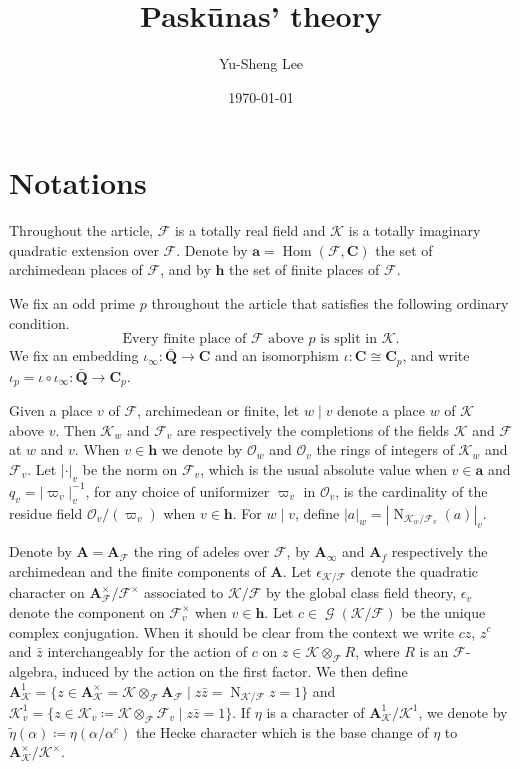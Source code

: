 \documentclass[leqno]{amsart}
\theoremstyle{definition}
\theoremstyle{remark}
\newcommand{\oo}{\mathcal{O}}
\newcommand{\Q}{{\mathbf{Q}}}
\newcommand{\C}{\mathbf C}
\newcommand{\A}{\mathbf A}
\newcommand{\arch}{\mathbf{a}}
\newcommand{\finite}{\mathbf{h}}
\DeclareMathOperator{\Nr}{N}
\DeclareMathOperator{\Hom}{Hom}
\DeclareMathOperator{\Gal}{\mathcal{G}}
\newcommand{\F}{{\mathcal{F}}} %
\newcommand{\K}{{\mathcal{K}}} %
\newcommand{\qch}{\epsilon} %
\begin{document}
\title{Pask\={u}nas' theory}
\author[Y-S.~Lee]{Yu-Sheng Lee}
\address{Department of Mathematics, University  of Michigan, Ann Arbor, MI 48109, USA}
\date{\today}

\maketitle
\setcounter{tocdepth}{1}
\tableofcontents

\section{Notations}

Throughout the article, $\F$ is a totally real field
and $\K$ is a totally imaginary quadratic extension over $\F$.
Denote by $\arch=\Hom(\F, \C)$ 
the set of archimedean places of $\F$,
and by $\finite$ the set of finite places of $\F$.

We fix an odd prime $p$ throughout the article
that satisfies the following ordinary condition.
\begin{equation}\label{cond:ord}\tag{ord}
\text{Every finite place of $\F$ above $p$ is split in $\K$}.
\end{equation}
We fix an embedding $\iota_\infty:\bar{\Q}\to \C$
and an isomorphism $\iota:\C\cong \C_p$,
and write $\iota_p=\iota\circ\iota_\infty:\bar{\Q}\to \C_p$.


Given a place $v$ of $\F$, archimedean or finite,
let $w\mid v$ denote a place $w$ of $\K$ above $v$.
Then $\K_w$ and $\F_v$ are respectively
the completions of the fields $\K$ and $\F$ at $w$ and $v$.
When $v\in \finite$ we denote by $\oo_w$ and $\oo_v$ 
the rings of integers of $\K_w$ and $\F_v$.
Let $|\cdot|_v$ be the norm on $\F_v$,
which is the usual absolute value when $v\in \arch$
and $q_v=|\varpi_v|_v^{-1}$,
for any choice of uniformizer $\varpi_v$ in $\oo_v$,
is the cardinality of the residue field $\oo_v/(\varpi_v)$
when $v\in \finite$.
For $w\mid v$, define $|a|_w=|\Nr_{\K_w/\F_v}(a)|_v$.


Denote by $\A=\A_{\F}$ the ring of adeles over $\F$,
by $\A_{\infty}$ and $\A_{f}$ respectively
the archimedean and the finite components of $\A$.
Let $\qch_{\K/\F}$ denote 
the quadratic character on $\A_\F^\times/\F^\times$
associated to $\K/\F$ by the global class field theory,
$\qch_v$ denote the component on $\F_v^\times$ 
when $v\in \finite$.
Let $c\in \Gal(\K/\F)$ be the unique complex conjugation.
When it should be clear from the context
we write $cz$, $z^c$ and $\bar{z}$ interchangeably 
for the action of $c$ on $z\in \K\otimes_\F R$, where $R$ is an $\F$-algebra,
induced by the action on the first factor.
We then define 
$\A_\K^1=\{z\in \A^\times_\K=\K\otimes_\F \A_\F \mid z\bar{z}=\Nr_{\K/\F}z=1\}$ and
$\K_v^1=\{z\in \K_v\coloneqq \K\otimes_\F\F_v\mid z\bar{z}=1\}$.
If $\eta$ is a character of $\A_\K^1/\K^1$, 
we denote
by $\tilde{\eta}(\alpha)\coloneqq \eta(\alpha/\alpha^c)$
the Hecke character which is the base change of $\eta$ 
to $\A_\K^\times/\K^\times$.
\end{document}
